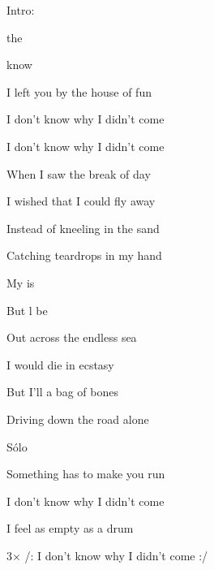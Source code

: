
\zs
Intro:           
\ks

\zs
{}  the  

 know   

I left you by the house of fun

I don't know why I didn't come

I don't know why I didn't come
\ks

\zs
When I saw the break of day

I wished that I could fly away

Instead of kneeling in the sand

Catching teardrops in my hand
\ks

\zr
My  is   

But l be  
        
\kr

\zs
Out across the endless sea

I would die in ecstasy

But I'll a bag of bones

Driving down the road alone
\ks

\zr
\kr

\zs
Sólo
\ks

\zs
Something has to make you run

I don't know why I didn't come

I feel as empty as a drum

3× /: I don't know why I didn't come :/
\ks

\kp
